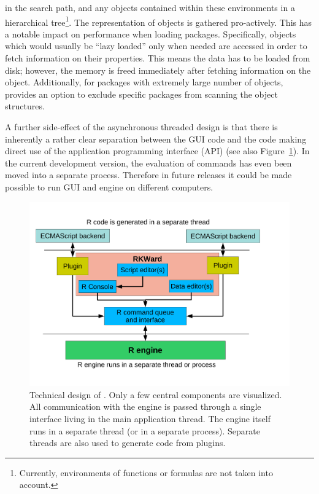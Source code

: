 in the search path, and any objects contained within these environments in a
hierarchical tree\footnote{
    Currently, environments of functions or formulas are not taken into account.
}. The representation of  objects is gathered
pro-actively. This has a notable impact on performance when loading packages.
Specifically, objects which would usually be ``lazy loaded'' only when needed \citep[see][]{Ripley2004} are
accessed in order to fetch information on their properties. This means the data
has to be loaded from disk; however, the memory is freed immediately after fetching
information on the object. Additionally, for packages with extremely large number of objects, 
provides an option to exclude specific packages from scanning the object structures.

A further side-effect of the asynchronous threaded design is that there is
inherently a rather clear separation between the GUI code and the code making direct use
of the  application programming interface (API) (see also Figure~\ref{fig:design_sketch}). 
In the current development version, the evaluation
of  commands has even been moved into a separate process. Therefore in future releases it could 
be made possible to run GUI and  engine on different computers.

\begin{figure}[t!]
 \centering
 \includegraphics{../figures/design_sketch.pdf}
 \caption{Technical design of . Only a few central components are visualized.
 All communication with the  engine is passed through a single interface living in the main application thread. The  engine itself
 runs in a separate thread (or in a separate process). 
 Separate threads are also used to generate  code from plugins.
}
 \label{fig:design_sketch}
\end{figure}

